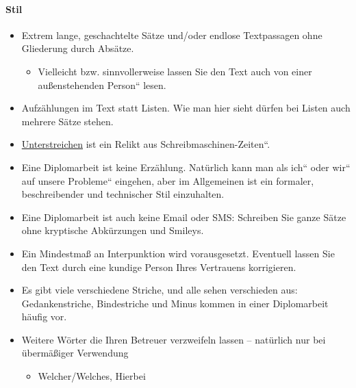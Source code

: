 \paragraph{Stil}
\begin{itemize}
\item Extrem lange, geschachtelte Sätze und/oder endlose Textpassagen ohne
Gliederung durch Absätze.\nopagebreak

\begin{itemize}
\item Vielleicht bzw. sinnvollerweise lassen Sie den Text auch von einer
\quotedblbase außenstehenden Person`` lesen.
\end{itemize}
\item Aufzählungen im Text statt Listen. Wie man hier sieht dürfen bei Listen
auch mehrere Sätze stehen.
\item \uline{Unterstreichen} ist ein Relikt aus \quotedblbase Schreibmaschinen-Zeiten``.
\item Eine Diplomarbeit ist keine Erzählung. Natürlich kann man als \quotedblbase ich``
oder \quotedblbase wir`` auf \quotedblbase unsere Probleme`` eingehen,
aber im Allgemeinen ist ein formaler, beschreibender und technischer
Stil einzuhalten.
\item Eine Diplomarbeit ist auch keine Email oder SMS: Schreiben Sie ganze
Sätze ohne kryptische Abkürzungen und Smileys.
\item Ein Mindestmaß an Interpunktion wird vorausgesetzt. Eventuell lassen
Sie den Text durch eine kundige Person Ihres Vertrauens korrigieren.
\item Es gibt viele verschiedene Striche, und alle sehen verschieden aus:
Gedankenstriche, Bindestriche und Minus kommen in einer Diplomarbeit
häufig vor.
\item Weitere Wörter die Ihren Betreuer verzweifeln lassen -- natürlich
nur bei übermäßiger Verwendung

\begin{itemize}
\item Welcher/Welches, Hierbei
\end{itemize}
\end{itemize}

